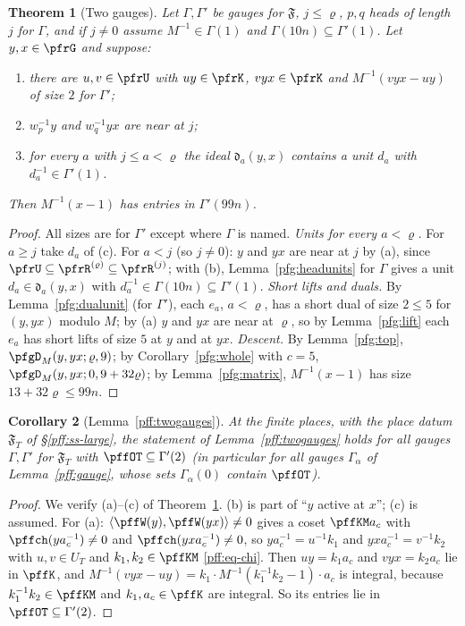 \documentclass[10pt]{amsart}
\newtheorem{theorem}{Theorem}[section]
\newtheorem{corollary}[theorem]{Corollary}
\theoremstyle{definition}
\theoremstyle{remark}
\begin{document}
\begin{theorem}[Two gauges]\label{pfg:twogauges}
Let $\Gamma,\Gamma'$ be gauges for $\mathfrak F$, $j\le\varrho$, $p,q$ heads of length $j$ for $\Gamma$, and if
$j\ne0$ assume $M^{-1}\in\Gamma(1)$ and $\Gamma(10n)\subseteq\Gamma'(1)$. Let $y,x\in\pfrG$ and suppose:
\begin{enumerate}
\item[(a)] there are $u,v\in\pfrU$ with $uy\in\pfrK$, $vyx\in\pfrK$ and $M^{-1}(vyx-uy)$ of size $2$ for $\Gamma'$;
\item[(b)] $w_p^{-1}y$ and $w_q^{-1}yx$ are near at $j$;
\item[(c)] for every $a$ with $j\le a<\varrho$ the ideal $\mathfrak d_a(y,x)$ contains a unit $d_a$ with
$d_a^{-1}\in\Gamma'(1)$.
\end{enumerate}
Then $M^{-1}(x-1)$ has entries in $\Gamma'(99n)$.
\end{theorem}
\begin{proof}
All sizes are for $\Gamma'$ except where $\Gamma$ is named. \emph{Units for every $a<\varrho$.} For $a\ge j$ take
$d_a$ of (c). For $a<j$ (so $j\ne0$): $y$ and $yx$ are near at $j$ by (a), since $\pfrU\subseteq\pfrR^{(\varrho)}
\subseteq\pfrR^{(j)}$; with (b), Lemma~\ref{pfg:headunits} for $\Gamma$ gives a unit $d_a\in\mathfrak d_a(y,x)$ with
$d_a^{-1}\in\Gamma(10n)\subseteq\Gamma'(1)$. \emph{Short lifts and duals.} By Lemma~\ref{pfg:dualunit} (for
$\Gamma'$), each $e_a$, $a<\varrho$, has a short dual of size $2\le5$ for $(y,yx)$ modulo $M$; by (a) $y$ and $yx$
are near at $\varrho$, so by Lemma~\ref{pfg:lift} each $e_a$ has short lifts of size $5$ at $y$ and at $yx$.
\emph{Descent.} By Lemma~\ref{pfg:top}, $\pfgD_M(y,yx;\varrho,9)$; by Corollary~\ref{pfg:whole} with $c=5$,
$\pfgD_M(y,yx;0,9+32\varrho)$; by Lemma~\ref{pfg:matrix}, $M^{-1}(x-1)$ has size $13+32\varrho\le99n$.
\end{proof}

\begin{corollary}[Lemma~\ref{pff:twogauges}]\label{pfg:twogaugesT}
At the finite places, with the place datum $\mathfrak F_T$ of \S\ref{pff:ss-large}, the statement of
Lemma~\ref{pff:twogauges} holds for all gauges $\Gamma,\Gamma'$ for $\mathfrak F_T$ with $\pffOT\subseteq\Gamma'(2)$
(in particular for all gauges $\Gamma_\alpha$ of Lemma~\ref{pff:gauge}, whose sets $\Gamma_\alpha(0)$ contain
$\pffOT$).
\end{corollary}
\begin{proof}
We verify (a)--(c) of Theorem~\ref{pfg:twogauges}. (b) is part of ``$y$ active at $x$''; (c) is assumed. For
(a): $\langle\pffW(y),\pffW(yx)\rangle\ne0$ gives a coset $\pffKM a_c$ with $\pffch(ya_c^{-1})\ne0$ and
$\pffch(yxa_c^{-1})\ne0$, so $ya_c^{-1}=u^{-1}k_1$ and $yxa_c^{-1}=v^{-1}k_2$ with $u,v\in U_T$ and
$k_1,k_2\in\pffKM$ \eqref{pff:eq-chi}. Then $uy=k_1a_c$ and $vyx=k_2a_c$ lie in $\pffK$, and
$M^{-1}(vyx-uy)=k_1\cdot M^{-1}(k_1^{-1}k_2-1)\cdot a_c$ is integral, because $k_1^{-1}k_2\in\pffKM$ and
$k_1,a_c\in\pffK$ are integral. So its entries lie in $\pffOT\subseteq\Gamma'(2)$.
\end{proof}
\end{document}
